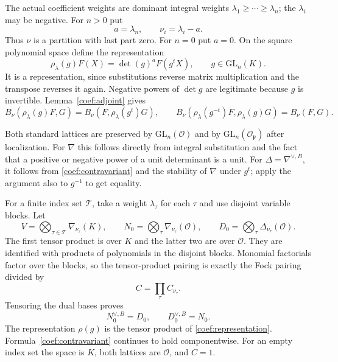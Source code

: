The actual coefficient weights are dominant integral weights
$\lambda_1\ge\cdots\ge\lambda_n$; the $\lambda_i$ may be negative.
For $n>0$ put
\[
 a=\lambda_n,\qquad \nu_i=\lambda_i-a.
\]
Thus $\nu$ is a partition with last part zero. For $n=0$ put $a=0$.
On the square polynomial space define the representation
\begin{equation}\label{coef:representation}
 \rho_\lambda(g)F(X)=\det(g)^a F(g^tX),\qquad g\in\mathrm{GL}_n(K).
\end{equation}
It is a representation, since substitutions reverse matrix
multiplication and the transpose reverses it again. Negative powers
of $\det g$ are legitimate because $g$ is invertible.
Lemma~\ref{coef:adjoint} gives
\begin{equation}\label{coef:contravariant}
 B_\nu(\rho_\lambda(g)F,G)
       =B_\nu(F,\rho_\lambda(g^t)G),\qquad
 B_\nu(\rho_\lambda(g^{-t})F,\rho_\lambda(g)G)=B_\nu(F,G).
\end{equation}

Both standard lattices are preserved by
$\mathrm{GL}_n(\mathcal O)$ and by
$\mathrm{GL}_n(\mathcal O_{\mathfrak p})$ after localization.
For $\nabla$ this follows directly from integral substitution and the
fact that a positive or negative power of a unit determinant is a unit.
For $\Delta=\nabla^{\vee,B}$, it follows from
\eqref{coef:contravariant} and the stability of $\nabla$ under $g^t$;
apply the argument also to $g^{-1}$ to get equality.

For a finite index set $\mathcal T$, take a weight $\lambda_\tau$
for each $\tau$ and use disjoint variable blocks. Let
\[
 V=\bigotimes_{\tau\in\mathcal T}\nabla_{\nu_\tau}(K),\qquad
 N_0=\bigotimes_\tau\nabla_{\nu_\tau}(\mathcal O),\qquad
 D_0=\bigotimes_\tau\Delta_{\nu_\tau}(\mathcal O).
\]
The first tensor product is over $K$ and the latter two are over
$\mathcal O$. They are identified with products of polynomials in
the disjoint blocks. Monomial factorials factor over the blocks, so
the tensor-product pairing is exactly the Fock pairing divided by
\[
                             C=\prod_\tau C_{\nu_\tau}.
\]
Tensoring the dual bases proves
\begin{equation}\label{coef:standard-tensor-duality}
                  N_0^{\vee,B}=D_0,\qquad D_0^{\vee,B}=N_0.
\end{equation}
The representation $\rho(g)$ is the tensor product of
\eqref{coef:representation}. Formula~\eqref{coef:contravariant}
continues to hold componentwise. For an empty index set the space is
$K$, both lattices are $\mathcal O$, and $C=1$.


